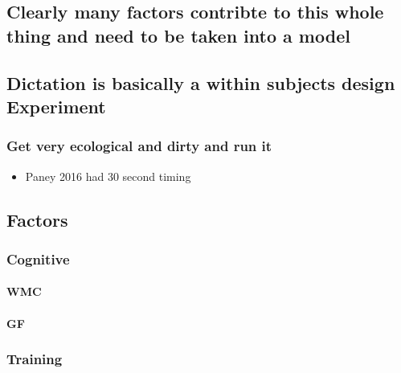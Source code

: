 \documentclass[]{book}
\providecommand{\tightlist}{%
  \setlength{\itemsep}{0pt}\setlength{\parskip}{0pt}}
\let\oldparagraph\paragraph
\renewcommand{\paragraph}[1]{\oldparagraph{#1}\mbox{}}
\theoremstyle{definition}
\theoremstyle{definition}
\theoremstyle{definition}
\theoremstyle{remark}
\begin{document}
\hypertarget{clearly-many-factors-contribte-to-this-whole-thing-and-need-to-be-taken-into-a-model}{%
\subsection{Clearly many factors contribte to this whole thing and need
to be taken into a
model}\label{clearly-many-factors-contribte-to-this-whole-thing-and-need-to-be-taken-into-a-model}}

\hypertarget{dictation-is-basically-a-within-subjects-design-experiment}{%
\subsection{Dictation is basically a within subjects design
Experiment}\label{dictation-is-basically-a-within-subjects-design-experiment}}

\hypertarget{get-very-ecological-and-dirty-and-run-it}{%
\subsubsection{Get very ecological and dirty and run
it}\label{get-very-ecological-and-dirty-and-run-it}}

\begin{itemize}
\tightlist
\item
  Paney 2016 had 30 second timing
\end{itemize}

\hypertarget{factors}{%
\subsection{Factors}\label{factors}}

\hypertarget{cognitive-1}{%
\subsubsection{Cognitive}\label{cognitive-1}}

\hypertarget{wmc}{%
\paragraph{WMC}\label{wmc}}

\hypertarget{gf}{%
\paragraph{GF}\label{gf}}

\hypertarget{training}{%
\subsubsection{Training}\label{training}}
\end{document}
